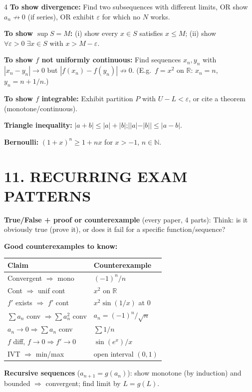 \documentclass[8pt,a4paper,landscape]{extarticle}
\begin{document}
\begin{multicols}{4}
\textbf{To show divergence:} Find two subsequences with different limits, OR show $a_n\not\to0$ (if series), OR exhibit $\varepsilon$ for which no $N$ works.

\textbf{To show $\sup S=M$:} (i) show every $x\in S$ satisfies $x\leq M$; (ii) show $\forall\varepsilon>0\;\exists x\in S$ with $x>M-\varepsilon$.

\textbf{To show $f$ not uniformly continuous:} Find sequences $x_n,y_n$ with $|x_n-y_n|\to0$ but $|f(x_n)-f(y_n)|\not\to0$. (E.g.\ $f=x^2$ on $\mathbb{R}$: $x_n=n$, $y_n=n+1/n$.)

\textbf{To show $f$ integrable:} Exhibit partition $P$ with $U-L<\varepsilon$, or cite a theorem (monotone/continuous).

\textbf{Triangle inequality:} $|a+b|\leq|a|+|b|$;\quad $||a|-|b||\leq|a-b|$.

\textbf{Bernoulli:} $(1+x)^n\geq1+nx$ for $x>-1$, $n\in\mathbb{N}$.

\section*{11. RECURRING EXAM PATTERNS}

\textbf{True/False + proof or counterexample} (every paper, 4 parts):
Think: is it obviously true (prove it), or does it fail for a specific function/sequence?

\textbf{Good counterexamples to know:}

\begin{tabular}{@{}p{3.2cm}p{2.8cm}@{}}
\toprule
Claim & Counterexample \\
\midrule
Convergent $\Rightarrow$ mono & $(-1)^n/n$ \\
Cont $\Rightarrow$ unif cont & $x^2$ on $\mathbb{R}$ \\
$f'$ exists $\Rightarrow$ $f'$ cont & $x^2\sin(1/x)$ at $0$ \\
$\sum a_n$ conv $\Rightarrow\sum a_n^2$ conv & $a_n=(-1)^n/\sqrt{n}$ \\
$a_n\to0\Rightarrow\sum a_n$ conv & $\sum1/n$ \\
$f$ diff, $f\to0\Rightarrow f'\to0$ & $\sin(e^x)/x$ \\
IVT $\Rightarrow$ min/max & open interval $(0,1)$ \\
\bottomrule
\end{tabular}

\textbf{Recursive sequences} ($a_{n+1}=g(a_n)$): show monotone (by induction) and bounded $\Rightarrow$ convergent; find limit by $L=g(L)$.


\end{multicols}
\end{document}
